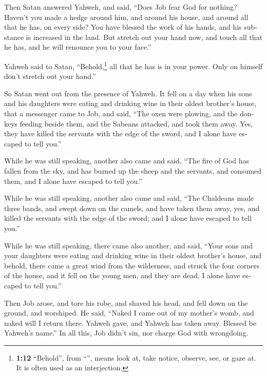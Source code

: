 \begin{paracol}{2}
\begin{otherlanguage}{english}
 Then Satan answered Yahweh, and said, ``Does Job fear God
for nothing?  Haven't you made a hedge around him, and
around his house, and around all that he has, on every side? You have
blessed the work of his hands, and his substance is increased in the
land.  But stretch out your hand now, and touch all that
he has, and he will renounce you to your face.''

 Yahweh said to Satan, ``Behold,\footnote{\textbf{1:12}
  ``Behold'', from ``'', means look at, take notice,
  observe, see, or gaze at. It is often used as an interjection.} all
that he has is in your power. Only on himself don't stretch out your
hand.''

So Satan went out from the presence of Yahweh.  It fell
on a day when his sons and his daughters were eating and drinking wine
in their oldest brother's house,  that a messenger came
to Job, and said, ``The oxen were plowing, and the donkeys feeding
beside them,  and the Sabeans attacked, and took them
away. Yes, they have killed the servants with the edge of the sword, and
I alone have escaped to tell you.''

 While he was still speaking, another also came and said,
``The fire of God has fallen from the sky, and has burned up the sheep
and the servants, and consumed them, and I alone have escaped to tell
you.''

 While he was still speaking, another also came and said,
``The Chaldeans made three bands, and swept down on the camels, and have
taken them away, yes, and killed the servants with the edge of the
sword; and I alone have escaped to tell you.''

 While he was still speaking, there came also another,
and said, ``Your sons and your daughters were eating and drinking wine
in their oldest brother's house,  and behold, there came
a great wind from the wilderness, and struck the four corners of the
house, and it fell on the young men, and they are dead. I alone have
escaped to tell you.''

 Then Job arose, and tore his robe, and shaved his head,
and fell down on the ground, and worshiped.  He said,
``Naked I came out of my mother's womb, and naked will I return there.
Yahweh gave, and Yahweh has taken away. Blessed be Yahweh's name.''
 In all this, Job didn't sin, nor charge God with
wrongdoing.


\end{otherlanguage}
\end{paracol}
